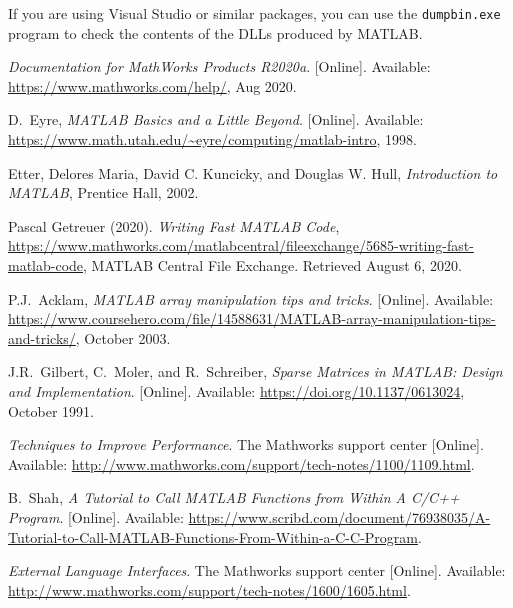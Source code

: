 \documentclass[10pt,a4paper]{article}
\begin{document}
If you are using Visual Studio or similar packages, you can use the \texttt{dumpbin.exe} program to check the contents of the DLLs produced by MATLAB.
%
\vfill
\begin{thebibliography}{1}

\emph{Documentation for MathWorks Products R2020a}. [Online]. Available: \url{https://www.mathworks.com/help/}, Aug 2020.

D.~Eyre, \emph{MATLAB Basics and a Little Beyond}. [Online]. Available: \url{https://www.math.utah.edu/~eyre/computing/matlab-intro}, 1998.


Etter, Delores Maria, David C. Kuncicky, and Douglas W. Hull, \emph{Introduction to MATLAB}, Prentice Hall, 2002.

 Pascal Getreuer (2020). \emph{Writing Fast MATLAB Code}, \url{https://www.mathworks.com/matlabcentral/fileexchange/5685-writing-fast-matlab-code}, MATLAB Central File Exchange. Retrieved August 6, 2020.

P.J.~Acklam, \emph{MATLAB array manipulation tips and tricks}. [Online]. Available: \url{https://www.coursehero.com/file/14588631/MATLAB-array-manipulation-tips-and-tricks/}, October 2003.

J.R.~Gilbert, C.~Moler, and R.~Schreiber, \emph{Sparse Matrices in MATLAB: Design and Implementation}. [Online]. Available: \url{https://doi.org/10.1137/0613024}, October 1991.

\emph{Techniques to Improve Performance}. The Mathworks support center [Online]. Available: \url{http://www.mathworks.com/support/tech-notes/1100/1109.html}.

B.~Shah, \emph{A Tutorial to Call MATLAB Functions from Within A  C/C++ Program}. [Online]. Available: \url{https://www.scribd.com/document/76938035/A-Tutorial-to-Call-MATLAB-Functions-From-Within-a-C-C-Program}.

\emph{External Language Interfaces}. The Mathworks support center [Online]. Available: \url{http://www.mathworks.com/support/tech-notes/1600/1605.html}.

\end{thebibliography}
\end{document}
